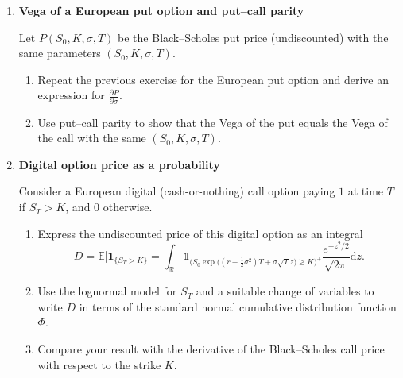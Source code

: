 \documentclass[11pt]{article}
\newcommand{\R}{\mathbb{R}}
\begin{document}
\begin{enumerate}
\begin{enumerate}
\item Starting from the integral representation in the previous exercise, differentiate under the integral sign with respect to \(\sigma\). Justify briefly why the differentiation and integration may be interchanged.
\item Perform appropriate changes of variables to simplify the derivative.
\item Show that Vega can be written in the standard Black--Scholes closed form
\[
\text{Vega} = S_0 \sqrt{T}\,\phi(d_1),
\]
for the appropriate \(d_1\).
\end{enumerate}

\bigskip
\item \textbf{Vega of a European put option and put--call parity}

Let \(P(S_0,K,\sigma,T)\) be the Black--Scholes put price (undiscounted) with the same parameters \((S_0,K,\sigma,T)\).

\begin{enumerate}
\item Repeat the previous exercise for the European put option and derive an expression for \(\displaystyle \frac{\partial P}{\partial \sigma}\).
\item Use put--call parity to show that the Vega of the put equals the Vega of the call with the same \((S_0,K,\sigma,T)\).
\end{enumerate}

\bigskip
\item \textbf{Digital option price as a probability}

Consider a European digital (cash-or-nothing) call option paying \(1\) at time \(T\) if \(S_T > K\), and \(0\) otherwise.

\begin{enumerate}
\item Express the undiscounted price of this digital option as an integral
\[
D = \mathbb{E}\big[ \mathbf{1}_{\{S_T > K\}} 
=
\int_{\R} 
\mathds{1}_{
 \Big(
 S_0\exp\big( (r-\tfrac12\sigma^2)T+\sigma\sqrt{T}z\big) 
 \geq
 K
 \Big)^{+} }
 \frac{e^{-z^2/2}}{\sqrt{2\pi}} 
\mathrm{d}z
.
\]
\item Use the lognormal model for \(S_T\) and a suitable change of variables to write \(D\) in terms of the standard normal cumulative distribution function \(\Phi\).
\item Compare your result with the derivative of the Black--Scholes call price with respect to the strike \(K\).
\end{enumerate}






\end{enumerate}
\end{document}
